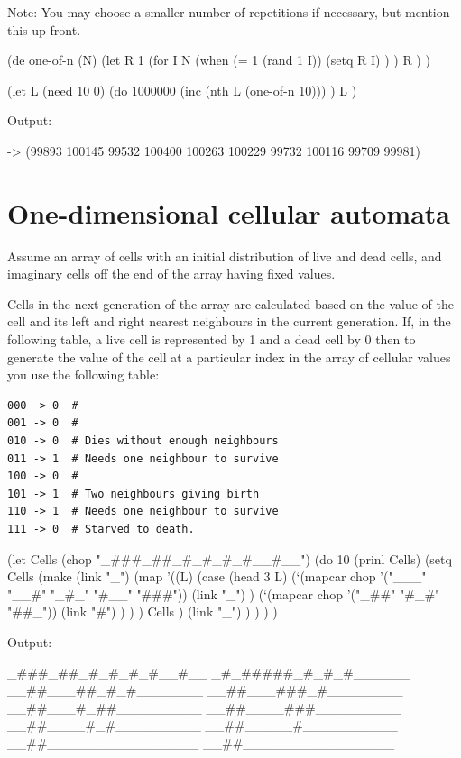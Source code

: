 Note: You may choose a smaller number of repetitions if necessary, but
mention this up-front.


\begin{wideverbatim}

(de one-of-n (N)
   (let R 1
      (for I N
         (when (= 1 (rand 1 I))
            (setq R I) ) )
      R ) )

(let L (need 10 0)
   (do 1000000
      (inc (nth L (one-of-n 10))) )
   L )

Output:

-> (99893 100145 99532 100400 100263 100229 99732 100116 99709 99981)

\end{wideverbatim}

\pagebreak{}
\section*{One-dimensional cellular automata}

Assume an array of cells with an initial distribution of live and dead
cells, and imaginary cells off the end of the array having fixed values.

Cells in the next generation of the array are calculated based on the
value of the cell and its left and right nearest neighbours in the
current generation. If, in the following table, a live cell is
represented by 1 and a dead cell by 0 then to generate the value of the
cell at a particular index in the array of cellular values you use the
following table:

\begin{verbatim}
000 -> 0  # 
001 -> 0  #
010 -> 0  # Dies without enough neighbours
011 -> 1  # Needs one neighbour to survive
100 -> 0  #
101 -> 1  # Two neighbours giving birth
110 -> 1  # Needs one neighbour to survive
111 -> 0  # Starved to death.
\end{verbatim}



\begin{wideverbatim}

(let Cells (chop "_###_##_#_#_#_#__#__")
   (do 10
      (prinl Cells)
      (setq Cells
         (make
            (link "_")
            (map
               '((L)
                  (case (head 3 L)
                     (`(mapcar chop '("___" "__#" "_#_" "#__" "###"))
                         (link "_") )
                     (`(mapcar chop '("_##" "#_#" "##_"))
                        (link "#") ) ) )
               Cells )
            (link "_") ) ) ) )

Output:

_###_##_#_#_#_#__#__
_#_#####_#_#_#______
__##___##_#_#_______
__##___###_#________
__##___#_##_________
__##____###_________
__##____#_#_________
__##_____#__________
__##________________
__##________________

\end{wideverbatim}

